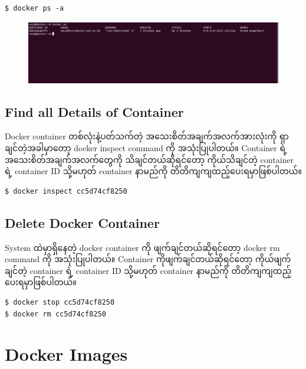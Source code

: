 \documentclass{article}
\begin{document}
\begin{verbatim}
$ docker ps -a
\end{verbatim}

\begin{figure}[htbp]
\centering
\includegraphics[width=0.70\paperwidth]{.gitbook/assets/4a_ps-large-resolution.png}
\end{figure}

\subsection{Find all Details of
Container}\label{find-all-details-of-container}

Docker container တစ်လုံးနဲ့ပတ်သက်တဲ့ အသေးစိတ်အချက်အလက်အားလုံးကို
ရှာချင်တဲ့အခါမှာတော့ docker inspect command ကို အသုံးပြုပါတယ်။ Container
ရဲ့ အသေးစိတ်အချက်အလက်တွေကို သိချင်တယ်ဆိုရင်တော့ ကိုယ်သိချင်တဲ့ container
ရဲ့ container ID သို့မဟုတ် container နာမည်ကို
တိတိကျကျထည့်ပေးရမှာဖြစ်ပါတယ်။

\begin{verbatim}
$ docker inspect cc5d74cf8250
\end{verbatim}

\subsection{Delete Docker Container}\label{delete-docker-container}

System ထဲမှာရှိနေတဲ့ docker container ကို ဖျက်ချင်တယ်ဆိုရင်တော့ docker
rm command ကို အသုံးပြုပါတယ်။ Container ကိုဖျက်ချင်တယ်ဆိုရင်တော့
ကိုယ်ဖျက်ချင်တဲ့ container ရဲ့ container ID သို့မဟုတ် container နာမည်ကို
တိတိကျကျထည့်ပေးရမှာဖြစ်ပါတယ်။

\begin{verbatim}
$ docker stop cc5d74cf8250
$ docker rm cc5d74cf8250
\end{verbatim}

\pagebreak

\section{Docker Images}\label{docker-images}
\end{document}
